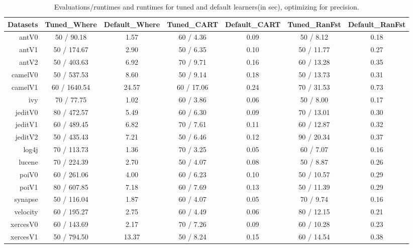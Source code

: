 \documentclass{sig-alternative}
\begin{document}
\begin{table}[!ht]

\renewcommand{\baselinestretch}{0.75}
\scriptsize
\centering
  \begin{tabular}{r|c |c |c |c |c |c }
    Datasets & Tuned\_Where & Default\_Where & Tuned\_CART & Default\_CART & Tuned\_RanFst & Default\_RanFst\\
    \hline
    antV0 & 50 / 90.18 & 1.57 & 60 / 4.36 & 0.09 & 50 / 8.12 & 0.18\\
    antV1 & 50 / 174.67 & 2.90 & 50 / 6.35 & 0.10 & 50 / 11.77 & 0.27\\
    antV2 & 50 / 403.63 & 6.92 & 70 / 9.71 & 0.16 & 60 / 13.28 & 0.35\\
    camelV0 & 50 / 537.53 & 8.60 & 50 / 9.14 & 0.18 & 50 / 13.73 & 0.31\\
    camelV1 & 60 / 1640.54 & 24.57 & 60 / 17.06 & 0.24 & 70 / 31.53 & 0.73\\
    ivy & 70 / 77.75 & 1.02 & 60 / 3.86 & 0.06 & 50 / 8.00 & 0.17\\
    jeditV0 & 80 / 472.57 & 5.49 & 60 / 6.30 & 0.09 & 70 / 13.01 & 0.30\\
    jeditV1 & 60 / 489.45 & 6.82 & 70 / 7.61 & 0.11 & 60 / 12.87 & 0.32\\
    jeditV2 & 50 / 435.43 & 7.21 & 50 / 6.46 & 0.12 & 90 / 20.34 & 0.37\\
    log4j & 70 / 113.73 & 1.36 & 70 / 3.25 & 0.05 & 60 / 7.07 & 0.16\\
    lucene & 70 / 224.39 & 2.70 & 50 / 4.07 & 0.08 & 50 / 8.87 & 0.26\\
    poiV0 & 60 / 261.06 & 4.00 & 60 / 6.23 & 0.10 & 50 / 10.57 & 0.29\\
    poiV1 & 80 / 607.85 & 7.18 & 60 / 7.69 & 0.13 & 50 / 11.39 & 0.29\\
    synapse & 50 / 116.04 & 1.87 & 60 / 4.07 & 0.05 & 70 / 9.74 & 0.16\\
    velocity & 60 / 195.27 & 2.75 & 60 / 4.49 & 0.06 & 80 / 12.15 & 0.21\\
    xercesV0 & 60 / 143.69 & 2.17 & 70 / 7.26 & 0.09 & 60 / 10.28 & 0.23\\
    xercesV1 & 50 / 794.50 & 13.37 & 50 / 8.24 & 0.15 & 60 / 14.54 & 0.38\\

  \end{tabular}
  \caption{Evaluations/runtimes and runtimes for tuned and default learners(in sec), optimizing for  precision.  }\label{tab:etimes}
\end{table}
\end{document}
